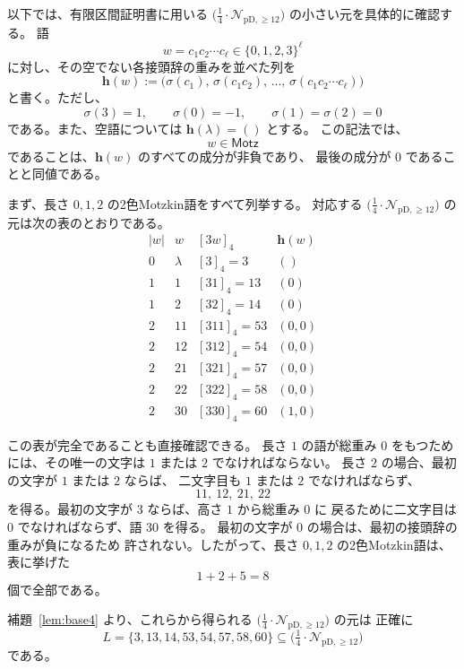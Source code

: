 \documentclass[12pt]{ltjsarticle}
\theoremstyle{plain}
\theoremstyle{definition}
\theoremstyle{plain}
\newcommand{\Pset}{%
  \bigl(\tfrac{1}{4}\cdot\mathcal{N}_{\mathrm{pD},\geq 12}\bigr)%
}
\begin{document}
以下では、有限区間証明書に用いる $\Pset$ の小さい元を具体的に確認する。
語
\[
 w=c_1c_2\cdots c_\ell\in\{0,1,2,3\}^{\ell}
\]
に対し、その空でない各接頭辞の重みを並べた列を
\[
 \mathbf h(w):=
 \bigl(
 \sigma(c_1),\,
 \sigma(c_1c_2),\,
 \ldots,\,
 \sigma(c_1c_2\cdots c_\ell)
 \bigr)
\]
と書く。ただし、
\[
 \sigma(3)=1,\qquad
 \sigma(0)=-1,\qquad
 \sigma(1)=\sigma(2)=0
\]
である。また、空語については $\mathbf h(\lambda)=()$ とする。
この記法では、
\[
 w\in\mathsf{Motz}
\]
であることは、$\mathbf h(w)$ のすべての成分が非負であり、
最後の成分が $0$ であることと同値である。

まず、長さ $0,1,2$ の2色Motzkin語をすべて列挙する。
対応する $\Pset$ の元は次の表のとおりである。
\[
\begin{array}{c|c|c|c}
 |w|&w&[3w]_4&\mathbf h(w)\\ \hline
0&\lambda &[3]_4=3&()\\ \hline
1&1 &[31]_4=13&(0)\\
1&2 &[32]_4=14&(0)\\ \hline
2&11 &[311]_4=53&(0,0)\\
2&12 &[312]_4=54&(0,0)\\
2&21 &[321]_4=57&(0,0)\\
2&22 &[322]_4=58&(0,0)\\
2&30 &[330]_4=60&(1,0)
\end{array}
\]

この表が完全であることも直接確認できる。
長さ $1$ の語が総重み $0$ をもつためには、その唯一の文字は
$1$ または $2$ でなければならない。
長さ $2$ の場合、最初の文字が $1$ または $2$ ならば、
二文字目も $1$ または $2$ でなければならず、
\[
 11,\ 12,\ 21,\ 22
\]
を得る。最初の文字が $3$ ならば、高さ $1$ から総重み $0$ に
戻るために二文字目は $0$ でなければならず、語 $30$ を得る。
最初の文字が $0$ の場合は、最初の接頭辞の重みが負になるため
許されない。したがって、長さ $0,1,2$ の2色Motzkin語は、
表に挙げた
\[
 1+2+5=8
\]
個で全部である。

補題~\ref{lem:base4} より、これらから得られる $\Pset$ の元は
正確に
\begin{equation}\label{eq:L-def}
 L=\{3,13,14,53,54,57,58,60\}
 \subseteq\Pset
\end{equation}
である。
\end{document}
